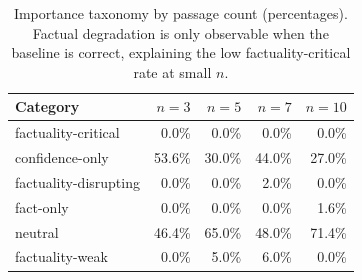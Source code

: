 \begin{table}[h]
\centering\small
\begin{tabular}{lrrrr}
\toprule
Category & $n=3$ & $n=5$ & $n=7$ & $n=10$ \\
\midrule
  factuality-critical & 0.0\% & 0.0\% & 0.0\% & 0.0\% \\
  confidence-only & 53.6\% & 30.0\% & 44.0\% & 27.0\% \\
  factuality-disrupting & 0.0\% & 0.0\% & 2.0\% & 0.0\% \\
  fact-only & 0.0\% & 0.0\% & 0.0\% & 1.6\% \\
  neutral & 46.4\% & 65.0\% & 48.0\% & 71.4\% \\
  factuality-weak & 0.0\% & 5.0\% & 6.0\% & 0.0\% \\
\bottomrule
\end{tabular}
\caption{Importance taxonomy by passage count (percentages). Factual degradation is only observable when the baseline is correct, explaining the low factuality-critical rate at small $n$.}
\label{tab:e2_taxonomy_by_passage_num}
\end{table}
